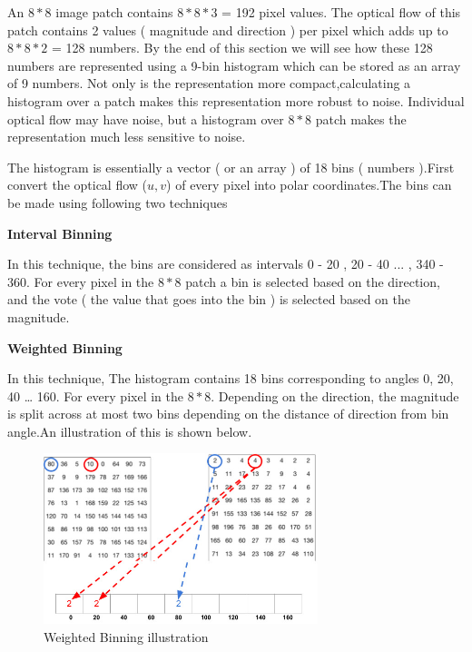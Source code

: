 An \begin{math}8*8\end{math} image patch contains \begin{math}8*8*3\end{math} = 192 pixel values. The optical flow of this patch contains 2 values ( magnitude and direction ) per pixel which adds up to \begin{math}8*8*2\end{math} = 128 numbers. By the end of this section we will see how these 128 numbers are represented using a 9-bin histogram which can be stored as an array of 9 numbers. Not only is the representation more compact,calculating a histogram over a patch makes this representation more robust to noise. Individual optical flow may have noise, but a histogram over \begin{math}8*8\end{math} patch makes the representation much less sensitive to noise.

The histogram is essentially a vector ( or an array ) of 18 bins ( numbers ).First convert the optical flow ($u,v$) of every pixel into polar coordinates.The bins can be made using following two techniques

\textbf{Interval Binning}


In this technique, the bins are considered as intervals 0 - 20 , 20 - 40 ... , 340 - 360. For every pixel in the \begin{math}8*8\end{math} patch a bin is selected based on the direction, and the vote ( the value that goes into the bin ) is selected based on the magnitude.

\newpage

\textbf{Weighted Binning}

In this technique, The histogram contains 18 bins corresponding to angles 0, 20, 40 … 160. For every pixel in the \begin{math}8*8\end{math}. Depending on the direction, the magnitude is split across at most two bins depending on the distance of direction from bin angle.An illustration of this is shown below.

\begin{figure} [!htbp]
\centering
\includegraphics[width=80mm]{Pictures/HOF.jpg}
\caption{Weighted Binning illustration}
\end{figure}

